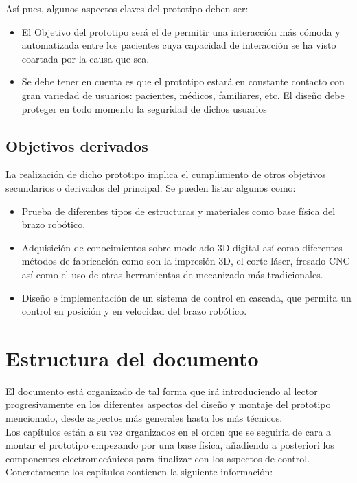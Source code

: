 Así pues, algunos aspectos claves del prototipo deben ser:
\begin{itemize}
    \item El Objetivo del prototipo será el de permitir una interacción más cómoda y automatizada entre los pacientes cuya capacidad de interacción se ha visto coartada por la causa que sea.
    \item Se debe tener en cuenta es que el prototipo estará en constante contacto con gran variedad de usuarios: pacientes, médicos, familiares, etc. El diseño debe proteger en todo momento la seguridad de dichos usuarios
\end{itemize}

\subsection{Objetivos derivados}

La realización de dicho prototipo implica el cumplimiento de otros objetivos secundarios o derivados del principal. Se pueden listar algunos como:
\begin{itemize}
    \item Prueba de diferentes tipos de estructuras y materiales como base física del brazo robótico.
    \item Adquisición de conocimientos sobre modelado 3D digital así como diferentes métodos de fabricación como son la impresión 3D, el corte láser, fresado CNC así como el uso de otras herramientas de mecanizado más tradicionales.
    \item Diseño e implementación de un sistema de control en cascada, que permita un control en posición y en velocidad del brazo robótico.
\end{itemize}


\section{Estructura del documento}

El documento está organizado de tal forma que irá introduciendo al lector progresivamente en los diferentes aspectos del diseño y montaje del prototipo mencionado, desde aspectos más generales hasta los más técnicos.
\\

Los capítulos están a su vez organizados en el orden que se seguiría de cara a montar el prototipo empezando por una base física, añadiendo a posteriori los componentes electromecánicos para finalizar con los aspectos de control. Concretamente los capítulos contienen la siguiente información:

